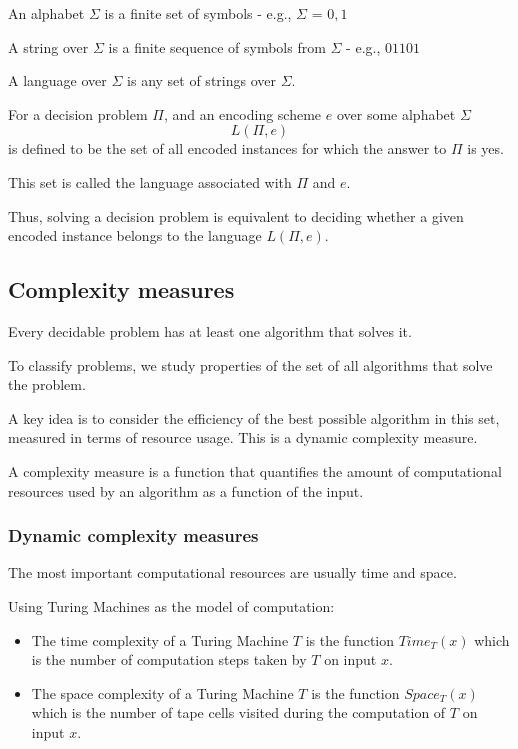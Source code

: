 \documentclass[11pt]{article}
\providecommand{\tightlist}{%
      \setlength{\itemsep}{0pt}\setlength{\parskip}{0pt}}
\begin{document}
An alphabet \(\Sigma\) is a finite set of symbols - e.g., \(\Sigma\) =
\({0, 1}\)

A string over \(\Sigma\) is a finite sequence of symbols from \(\Sigma\)
- e.g., \(01101\)

A language over \(\Sigma\) is any set of strings over \(\Sigma\).

For a decision problem \(\Pi\), and an encoding scheme \(e\) over some
alphabet \(\Sigma\) \[L(\Pi, e)\] is defined to be the set of all
encoded instances for which the answer to \(\Pi\) is yes.

This set is called the language associated with \(\Pi\) and \(e\).

Thus, solving a decision problem is equivalent to deciding whether a
given encoded instance belongs to the language \(L(\Pi, e)\).

    \subsection{Complexity measures}\label{complexity-measures}

Every decidable problem has at least one algorithm that solves it.

To classify problems, we study properties of the set of all algorithms
that solve the problem.

A key idea is to consider the efficiency of the best possible algorithm
in this set, measured in terms of resource usage. This is a dynamic
complexity measure.

A complexity measure is a function that quantifies the amount of
computational resources used by an algorithm as a function of the input.

\subsubsection{Dynamic complexity
measures}\label{dynamic-complexity-measures}

The most important computational resources are usually time and space.

Using Turing Machines as the model of computation:

\begin{itemize}
\tightlist
\item
  The time complexity of a Turing Machine \(T\) is the function
  \(Time_T(x)\) which is the number of computation steps taken by \(T\)
  on input \(x\).
\item
  The space complexity of a Turing Machine \(T\) is the function
  \(Space_T(x)\) which is the number of tape cells visited during the
  computation of \(T\) on input \(x\).
\end{itemize}
\end{document}
